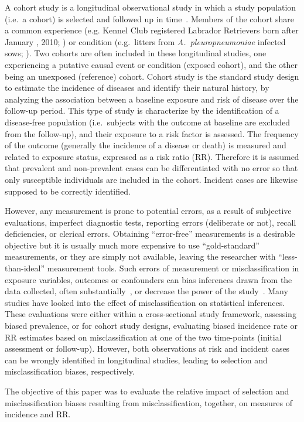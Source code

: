 A cohort study is a longitudinal observational study in which a study population
(i.e.\ a cohort)  is selected and followed up in
time~\citep{DosSantosSilva1999,Rothman2012}.
Members of the cohort share a common experience (e.g. Kennel Club registered
Labrador Retrievers born after January , 2010; \citealp{Clements_2013}) or
condition (e.g.\ litters from \emph{A.\ pleuropneumoniae} infected sows; \citealp{Tobias_2014}).
Two cohorts are often included in these longitudinal studies, one experiencing a
putative causal event or condition (exposed cohort), and the other being an
unexposed (reference) cohort.
Cohort study is the standard study design to estimate the incidence of diseases
and identify their natural history, by analyzing the association between a
baseline exposure and risk of disease over the follow-up period.
This type of study is characterize by the identification of a disease-free
population (i.e.\ subjects with the outcome at baseline are excluded from the
follow-up), and their exposure to a risk factor is assessed.
The frequency of the outcome (generally the incidence of a disease or death) is
measured and related to exposure status, expressed as a risk ratio (RR).
Therefore it is assumed that prevalent and non-prevalent cases can be
differentiated with no error so that only susceptible individuals are included
in the cohort.
Incident cases are likewise supposed to be correctly identified.

However, any measurement is prone to potential errors, as a result of subjective
evaluations, imperfect diagnostic tests, reporting errors (deliberate or not),
recall deficiencies, or clerical errors.
Obtaining ``error-free'' measurements is a desirable objective but it is
usually much more expensive to use ``gold-standard'' measurements, or they
are simply not available, leaving the researcher with ``less-than-ideal''
measurement tools.
Such errors of measurement or misclassification in exposure variables, outcomes
or confounders can bias inferences drawn from the data collected, often
substantially~\citep{Quade1980}, or decrease the power of the
study~\citep{Bross1954,WHITE_1986}.
Many studies have looked into the effect of misclassification on statistical
inferences.
These evaluations were either within a cross-sectional study framework,
assessing biased prevalence, or for cohort study designs, evaluating biased
incidence rate or RR estimates based on misclassification at one of the two
time-points (initial assessment or follow-up).
However, both observations at risk and incident cases can be wrongly identified
in longitudinal studies, leading to selection and misclassification biases,
respectively.

The objective of this paper was to evaluate the relative impact of selection and
misclassification biases resulting from misclassification, together, on measures
of incidence and RR.

